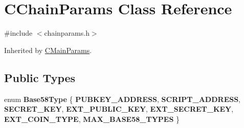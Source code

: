 \hypertarget{class_c_chain_params}{}\section{C\+Chain\+Params Class Reference}
\label{class_c_chain_params}


{\ttfamily \#include $<$chainparams.\+h$>$}



Inherited by \mbox{\hyperlink{class_c_main_params}{C\+Main\+Params}}.

\subsection*{Public Types}
\begin{DoxyCompactItemize}
\item 
\mbox{\label{class_c_chain_params_aa294058ec2e3586bd8d03d6c39667058}} 
enum {\bfseries Base58\+Type} \{ \newline
{\bfseries P\+U\+B\+K\+E\+Y\+\_\+\+A\+D\+D\+R\+E\+SS}, 
{\bfseries S\+C\+R\+I\+P\+T\+\_\+\+A\+D\+D\+R\+E\+SS}, 
{\bfseries S\+E\+C\+R\+E\+T\+\_\+\+K\+EY}, 
{\bfseries E\+X\+T\+\_\+\+P\+U\+B\+L\+I\+C\+\_\+\+K\+EY}, 
\newline
{\bfseries E\+X\+T\+\_\+\+S\+E\+C\+R\+E\+T\+\_\+\+K\+EY}, 
{\bfseries E\+X\+T\+\_\+\+C\+O\+I\+N\+\_\+\+T\+Y\+PE}, 
{\bfseries M\+A\+X\+\_\+\+B\+A\+S\+E58\+\_\+\+T\+Y\+P\+ES}
 \}
\end{DoxyCompactItemize}
